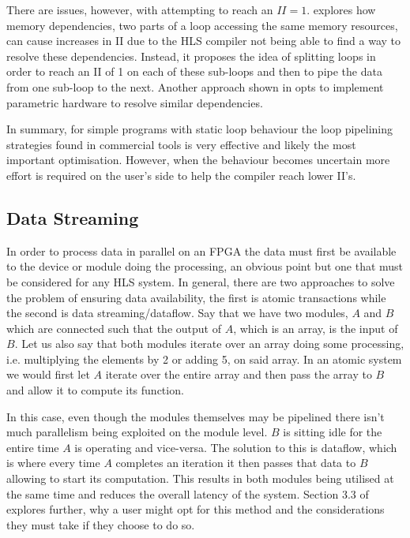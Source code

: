 There are issues, however, with attempting to reach an $II = 1$. \cite{7544750} explores how memory dependencies, two parts of a loop accessing the same memory resources, can cause increases in II due to the HLS compiler not being able to find a way to resolve these dependencies. Instead, it proposes the idea of splitting loops in order to reach an II of 1 on each of these sub-loops and then to pipe the data from one sub-loop to the next. Another approach shown in \cite{7160061} opts to implement parametric hardware to resolve similar dependencies. 

In summary, for simple programs with static loop behaviour the loop pipelining strategies found in commercial tools is very effective and likely the most important optimisation. However, when the behaviour becomes uncertain more effort is required on the user's side to help the compiler reach lower II's.

\subsection{Data Streaming}

In order to process data in parallel on an FPGA the data must first be available to the device or module doing the processing, an obvious point but one that must be considered for any HLS system. In general, there are two approaches to solve the problem of ensuring data availability, the first is atomic transactions while the second is data streaming/dataflow. Say that we have two modules, $A$ and $B$ which are connected such that the output of $A$, which is an array, is the input of $B$. Let us also say that both modules iterate over an array doing some processing, i.e. multiplying the elements by 2 or adding 5, on said array. In an atomic system we would first let $A$ iterate over the entire array and then pass the array to $B$ and allow it to compute its function. 

In this case, even though the modules themselves may be pipelined there isn't much parallelism being exploited on the module level. $B$ is sitting idle for the entire time $A$ is operating and vice-versa. The solution to this is dataflow, which is where every time $A$ completes an iteration it then passes that data to $B$ allowing to start its computation. This results in both modules being utilised at the same time and reduces the overall latency of the system. Section 3.3 of \cite{9264692} explores further, why a user might opt for this method and the considerations they must take if they choose to do so. 

